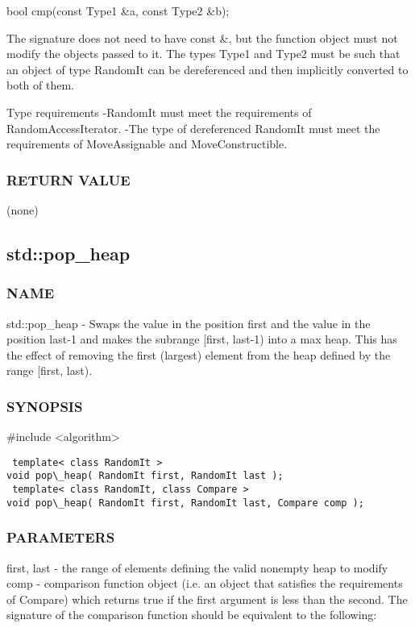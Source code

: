  bool cmp(const Type1 \&a, const Type2 \&b);

The signature does not need to have const \&, but the function object must not modify the objects passed to it.
The types Type1 and Type2 must be such that an object of type RandomIt can be dereferenced and then implicitly converted to both of them.

 Type requirements
 -RandomIt must meet the requirements of RandomAccessIterator.
 -The type of dereferenced RandomIt must meet the requirements of MoveAssignable and MoveConstructible.

\subsubsection{RETURN VALUE}
(none)



\subsection{std::pop\_heap}

\subsubsection{NAME}
std::pop\_heap - Swaps the value in the position first and the value in the position last-1 and makes the subrange [first, last-1) into a max heap. This has the effect of removing the first (largest) element from the heap defined by the range [first, last).

\subsubsection{SYNOPSIS}
\#include <algorithm>

\begin{lstlisting}
 template< class RandomIt >
void pop\_heap( RandomIt first, RandomIt last );
 template< class RandomIt, class Compare >
void pop\_heap( RandomIt first, RandomIt last, Compare comp );
\end{lstlisting}

\subsubsection{PARAMETERS}
first, last - the range of elements defining the valid nonempty heap to modify
comp - comparison function object (i.e. an object that satisfies the requirements of Compare) which returns true if the first argument is less than the second.
The signature of the comparison function should be equivalent to the following:


